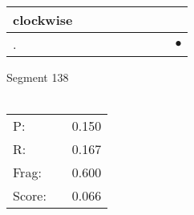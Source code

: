 \documentclass[landscape]{article}
\newcommand{\ssp}{\hspace{2pt}}
\newcommand{\mex}{\cellcolor{g}$\bullet$}
\begin{document}
\begin{tabular}{|l|p{10pt}|p{10pt}|p{10pt}|p{10pt}|p{10pt}|p{10pt}|p{10pt}|p{10pt}|}
\hline
\ssp clockwise \ssp&\hspace{2pt}&\hspace{2pt}&\hspace{2pt}&\hspace{2pt}&\hspace{2pt}&\hspace{2pt}&\hspace{2pt}&\hspace{2pt}\\
\hline
\ssp \cellcolor{ref7}. \ssp&\hspace{2pt}&\hspace{2pt}&\hspace{2pt}&\hspace{2pt}&\hspace{2pt}&\hspace{2pt}&\hspace{2pt}&\hspace{2pt}\mex\\
\hline
\end{tabular}

\vspace{6pt}
\noindent Segment 138\\\\
\noindent\begin{tabular}{lm{12pt}r}
\hline
P:&&0.150\\
R:&&0.167\\
Frag:&&0.600\\
Score:&&0.066\\
\end{tabular}

\newpage
\end{document}
